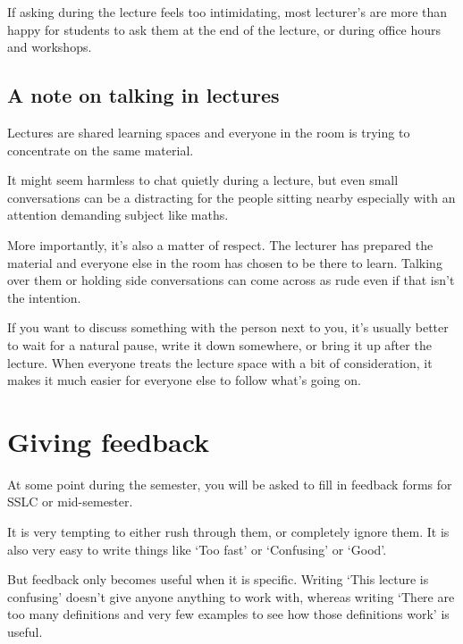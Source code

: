 If asking during the lecture feels too intimidating, most lecturer's are more than happy for students to ask them at the end of the lecture, or during office hours and workshops. 

\subsection{A note on talking in lectures}

Lectures are shared learning spaces and everyone in the room is trying to concentrate on the same material. 

It might seem harmless to chat quietly during a lecture, but even small conversations can be a distracting for the people sitting nearby especially with an attention demanding subject like maths. 

More importantly, it's also a matter of respect. The lecturer has prepared the material and everyone else in the room has chosen to be there to learn. Talking over them or holding side conversations can come across as rude even if that isn't the intention. 

If you want to discuss something with the person next to you, it's usually better to wait for a natural pause, write it down somewhere, or bring it up after the lecture. When everyone treats the lecture space with a bit of consideration, it makes it much easier for everyone else to follow what's going on. 


\section{Giving feedback}


At some point during the semester, you will be asked to fill in feedback forms for SSLC or mid-semester. 

It is very tempting to either rush through them, or completely ignore them. It is also very easy to write things like `Too fast' or `Confusing' or `Good'. 

But feedback only becomes useful when it is specific. Writing `This lecture is confusing' doesn't give anyone anything to work with, whereas writing `There are too many definitions and very few examples to see how those definitions work' is useful. 

